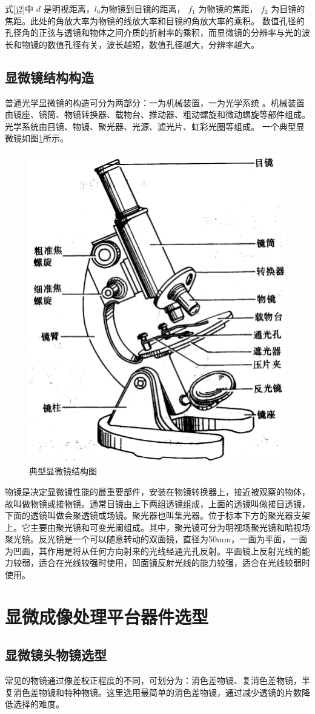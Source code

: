 式\ref{j2}中 $d$ 是明视距离，$l_{0}$为物镜到目镜的距离， $f_{1}$ 为物镜的焦距， $f_{2}$ 为目镜的焦距。此处的角放大率为物镜的线放大率和目镜的角放大率的乘积。
数值孔径的孔径角的正弦与透镜和物体之间介质的折射率的乘积，而显微镜的分辨率与光的波长和物镜的数值孔径有关，波长越短，数值孔径越大，分辨率越大\cite{fenbianlv}。


\subsection{显微镜结构构造}
普通光学显微镜的构造可分为两部分：一为机械装置，一为光学系统 。机械装置由镜座、镜筒、物镜转换器、载物台、推动器、粗动螺旋和微动螺旋等部件组成。光学系统由目镜、物镜、聚光器、光源、滤光片、虹彩光圈等组成。
一个典型显微镜如图\ref{fig:mi_1}所示。
\begin{figure}[h]
\centering
\includegraphics[width=0.5\linewidth]{Figure/mi_1}
\caption{典型显微镜结构图}
\label{fig:mi_1}
\end{figure}


物镜是决定显微镜性能的最重要部件，安装在物镜转换器上，接近被观察的物体，故叫做物镜或接物镜。通常目镜由上下两组透镜组成，上面的透镜叫做接目透镜，下面的透镜叫做会聚透镜或场镜。聚光器也叫集光器。位于标本下方的聚光器支架上。它主要由聚光镜和可变光阑组成。其中，聚光镜可分为明视场聚光镜和暗视场聚光镜。反光镜是一个可以随意转动的双面镜，直径为50mm，一面为平面，一面为凹面，其作用是将从任何方向射来的光线经通光孔反射。平面镜上反射光线的能力较弱，适合在光线较强时使用，凹面镜反射光线的能力较强，适合在光线较弱时使用。

\section{显微成像处理平台器件选型}
\subsection{显微镜头物镜选型}
常见的物镜通过像差校正程度的不同，可划分为：消色差物镜、复消色差物镜，半复消色差物镜和特种物镜。这里选用最简单的消色差物镜，通过减少透镜的片数降低选择的难度。

